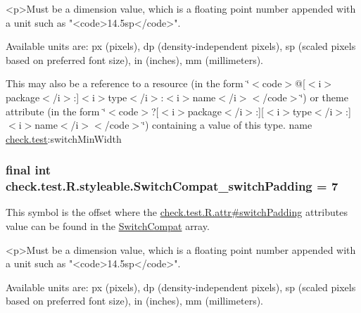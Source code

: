 \begin{DoxyVerb}      <p>Must be a dimension value, which is a floating point number appended with a unit such as "<code>14.5sp</code>".
\end{DoxyVerb}
 Available units are\+: px (pixels), dp (density-\/independent pixels), sp (scaled pixels based on preferred font size), in (inches), mm (millimeters). 

This may also be a reference to a resource (in the form \char`\"{}$<$code$>$@\mbox{[}$<$i$>$package$<$/i$>$\+:\mbox{]}$<$i$>$type$<$/i$>$\+:$<$i$>$name$<$/i$>$$<$/code$>$\char`\"{}) or theme attribute (in the form \char`\"{}$<$code$>$?\mbox{[}$<$i$>$package$<$/i$>$\+:\mbox{]}\mbox{[}$<$i$>$type$<$/i$>$\+:\mbox{]}$<$i$>$name$<$/i$>$$<$/code$>$\char`\"{}) containing a value of this type.  name \hyperlink{namespacecheck_1_1test}{check.\+test}\+:switch\+Min\+Width \hypertarget{classcheck_1_1test_1_1_r_1_1styleable_a91263d5b37a23dd554977465783c67bd}{}
\subsubsection[{Switch\+Compat\+\_\+switch\+Padding}]{\setlength{\rightskip}{0pt plus 5cm}final int check.\+test.\+R.\+styleable.\+Switch\+Compat\+\_\+switch\+Padding = 7\hspace{0.3cm}{\ttfamily [static]}}\label{classcheck_1_1test_1_1_r_1_1styleable_a91263d5b37a23dd554977465783c67bd}
This symbol is the offset where the \hyperlink{classcheck_1_1test_1_1_r_1_1attr_a142f39b9fb3ad458745e991e3a049d97}{check.\+test.\+R.\+attr\#switch\+Padding} attribute\textquotesingle{}s value can be found in the \hyperlink{classcheck_1_1test_1_1_r_1_1styleable_a0c8f3659ebec12826f8a2493fe43eaf4}{Switch\+Compat} array.

\begin{DoxyVerb}      <p>Must be a dimension value, which is a floating point number appended with a unit such as "<code>14.5sp</code>".
\end{DoxyVerb}
 Available units are\+: px (pixels), dp (density-\/independent pixels), sp (scaled pixels based on preferred font size), in (inches), mm (millimeters). 

